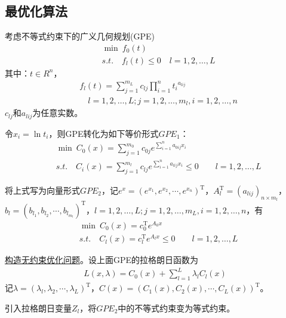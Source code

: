     \subsection{最优化算法}
        \par
        考虑不等式约束下的广义几何规划(GPE)
        \begin{align*}
            &\mathop{\min}\  f_0(t)\\
            &s.t.\quad f_l(t)\leqslant 0\quad l=1,2,\ldots,L
            \end{align*}
        其中：$t\in R^n$，
        \begin{align*}
        &f_l(t)=\mathop{\sum}\limits_{j=1}^{m_L}c_{lj}\mathop{\prod}\limits_{i=1}^{n}{t_i}^{a_{lij}}\\
        &\quad l=1,2,\ldots,L;j=1,2,\ldots,m_l,i=1,2,\ldots,n
        \end{align*}
        $c_{lj}$和$a_{lij}$为任意实数。
        \par
        令$x_i={\ln}{} t_i$，则GPE转化为如下等价形式$GPE_1$：
        \begin{align*}
        &\mathop{\min}\ C_0(x)=\mathop{\sum}\limits_{j=1}^{m_0}c_{0j}e^{\mathop{\sum}\limits_{i=1}^{n}a_{0ij}x_i}\\
        &s.t.\quad C_i(x)=\mathop{\sum}\limits_{j=1}^{m_l}c_{lj}e^{\mathop{\sum}\limits_{i=1}^{n}a_{lij}x_i}\leqslant 0\qquad l=1,2,\ldots,L
        \end{align*}
        \par
        将上式写为向量形式$GPE_2$，记$e^x=(e^{x_1},e^{x_2},\cdots,e^{x_n})^\mathrm{T} $，$A_l^\mathrm{T} =(a_{lij})_{n\times m_l}$，$b_l=(b_{l_1},b_{l_2},\cdots,b_{l_{m_l}})^\mathrm{T} $，$l=1,2,\ldots,L;j=1,2,\ldots,m_L,i=1,2,\ldots,n$，有
        \begin{align*}
        &\mathop{\min}\ C_0(x)=c_0^\mathrm{T} e^{A_0x}\\
        &s.t.\quad C_l(x)=c_{l}^\mathrm{T} e^{A_lx}\leqslant 0\qquad l=1,2,\ldots,L
        \end{align*}
        \par
        \underline{构造无约束优化问题}。设上面GPE的拉格朗日函数为
        \begin{align*}
        L(x,\lambda)=C_0(x)+\mathop{\sum}\limits_{l=1}^{L}{\lambda}_lC_l(x)
        \end{align*}
        记$\lambda=({\lambda}_l,{\lambda}_2,\cdots,{\lambda}_L)^\mathrm{T} $，$C(x)=(C_1(x),C_2(x),\cdots,C_L(x))^\mathrm{T} $。
        \par
        引入拉格朗日变量$Z_l$，将$GPE_2$中的不等式约束变为等式约束。
